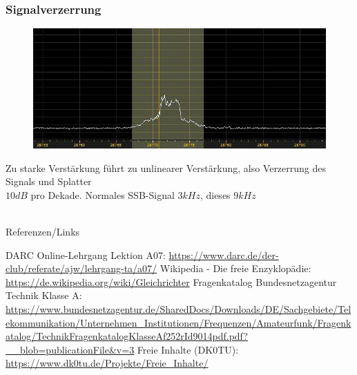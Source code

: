 \begin{frame}
  \frametitle{Signalverzerrung}
  \begin{center}
    \begin{figure}
      \includegraphics[width=1\textwidth,height=.5\textheight,keepaspectratio]{a07/splatter.jpg}
    \end{figure}
    Zu starke Verstärkung führt zu unlinearer Verstärkung, also Verzerrung des Signals und Splatter\\
    $10dB$ pro Dekade. Normales SSB-Signal $3kHz$, dieses $9kHz$
  \end{center}
\end{frame}

\renewcommand{\refname}{Referenzen}

\hypertarget{refs}{}
\textcolor{white}{} \\ %
\Large Referenzen/Links
\footnotesize

\begin{thebibliography}{}
    DARC Online-Lehrgang Lektion A07:
    \url{https://www.darc.de/der-club/referate/ajw/lehrgang-ta/a07/}
      Wikipedia - Die freie Enzyklopädie:
    \url{https://de.wikipedia.org/wiki/Gleichrichter}
     Fragenkatalog Bundesnetzagentur Technik Klasse A:
    \url{https://www.bundesnetzagentur.de/SharedDocs/Downloads/DE/Sachgebiete/Telekommunikation/Unternehmen_Institutionen/Frequenzen/Amateurfunk/Fragenkatalog/TechnikFragenkatalogKlasseAf252rId9014pdf.pdf?__blob=publicationFile&v=3}
      Freie Inhalte (DK0TU):
    \url{https://www.dk0tu.de/Projekte/Freie_Inhalte/}
\end{thebibliography}


